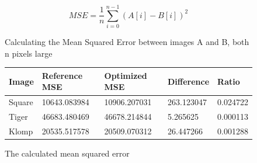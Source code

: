 \begin{figure}[h]
    \begin{equation}
    MSE = \frac{1}{n} \sum_{i=0}^{n-1} (A[i] - B[i])^{2}
    \end{equation}
    \caption{Calculating the Mean Squared Error between images A and B, both n pixels large}
    \label{eq:mse}
\end{figure}

\begin{figure}[h!]
    \centering
    \begin{tabular}{l | l l l l}
    Image   & Reference MSE & Optimized MSE     & Difference    & Ratio     \\
    \hline
    Square  & 10643.083984  & 10906.207031      & 263.123047    & 0.024722  \\
    Tiger   & 46683.480469  & 46678.214844      & 5.265625      & 0.000113  \\
    Klomp   & 20535.517578  & 20509.070312      & 26.447266     & 0.001288
    \end{tabular}
    \caption{The calculated mean squared error}
    \label{tab:mse}
\end{figure}
